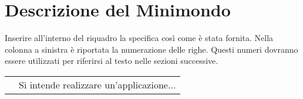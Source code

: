 \section{Descrizione del Minimondo}

\begin{templateblock}
    Inserire all’interno del riquadro la specifica così come è stata
    fornita. Nella colonna a sinistra è riportata la numerazione delle righe.
    Questi numeri dovranno essere utilizzati per riferirsi al testo nelle
    sezioni successive.
\end{templateblock}

\begin{tabularx}{\linewidth}{r|>{\internallinenumbers}X|}
    \cline{2-2} &
    Si intende realizzare un’applicazione...\hfill
    \\\cline{2-2}
\end{tabularx}
